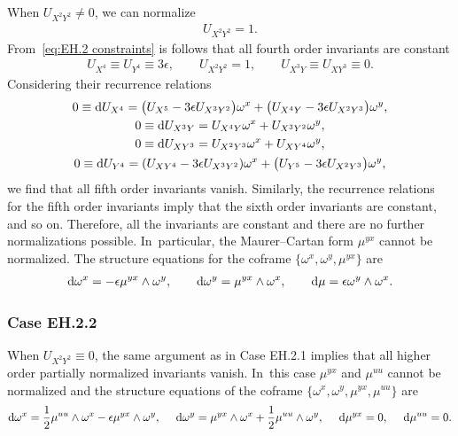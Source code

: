\documentclass[10pt,a4paper]{amsart}
\numberwithin{equation}{section}
\begin{document}
When $U_{X^2Y^2}\neq 0$, we can normalize
\begin{gather*}
U_{X^2Y^2} =1.
\end{gather*}
From~\eqref{eq:EH.2 constraints} is follows that all fourth order invariants are constant
\begin{gather*}
U_{X^4}\equiv U_{Y^4} \equiv 3\epsilon,\qquad U_{X^2Y^2}=1,\qquad U_{X^3Y}\equiv U_{XY^3}\equiv 0.
\end{gather*}
Considering their recurrence relations
%
\begin{gather*}
0 \equiv {\rm d}U_{X^4} = \big(U_{X^5}-3\epsilon U_{X^3Y^2}\big)\omega^x+\big(U_{X^4Y}-3\epsilon U_{X^2Y^3}\big)\omega^y,\\
%
0 \equiv {\rm d}U_{X^3Y} = U_{X^4Y}\omega^x + U_{X^3Y^2}\omega^y,\\
%
0 \equiv {\rm d}U_{XY^3} = U_{X^2Y^3}\omega^x + U_{XY^4}\omega^y,\\
%
0 \equiv {\rm d}U_{Y^4} = (U_{XY^4} - 3\epsilon U_{X^3Y^2})\omega^x + \big(U_{Y^5}-3\epsilon U_{X^2Y^3}\big)\omega^y,
\end{gather*}
%
we find that all fifth order invariants vanish. Similarly, the recurrence relations for the fifth order invariants imply that the sixth order invariants are constant, and so on. Therefore, all the invariants are constant and there are no further normalizations possible. In~particular, the Maurer--Cartan form $\mu^{yx}$ cannot be normalized. The structure equations for the coframe $\{\omega^x, \omega^y, \mu^{yx}\}$ are
\begin{gather*}
{\rm d}\omega^x = -\epsilon \mu^{yx}\wedge \omega^y,\qquad
{\rm d}\omega^y = \mu^{yx}\wedge \omega^x,\qquad
{\rm d}\mu = \epsilon \omega^y \wedge \omega^x.
\end{gather*}

\subsubsection{Case EH.2.2}

When $U_{X^2Y^2}\equiv 0$, the same argument as in Case EH.2.1 implies that all higher order partially normalized invariants vanish. In~this case $\mu^{yx}$ and $\mu^{uu}$ cannot be normalized and the structure equations of the coframe $\{\omega^x, \omega^y, \mu^{yx}, \mu^{uu}\}$ are
\begin{gather*}
{\rm d}\omega^x = \frac{1}{2} \mu^{uu}\wedge \omega^x - \epsilon \mu^{yx} \wedge \omega^y,\quad\
{\rm d}\omega^y = \mu^{yx} \wedge \omega^x + \frac{1}{2}\mu^{uu}\wedge \omega^y,\quad\
{\rm d}\mu^{yx} = 0,\quad\
{\rm d}\mu^{uu} = 0.
\end{gather*}
\end{document}
